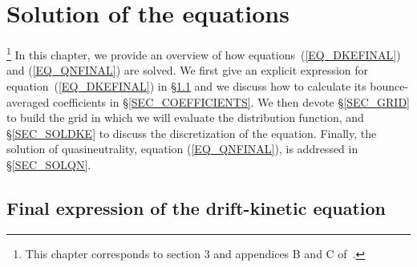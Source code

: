 \chapter{Solution of the equations}\label{CHAP_SOL}

\footnote{This chapter corresponds to section 3 and appendices B and C of~\citep{velasco2019knosos}.}
In this chapter, we provide an overview of how equations~(\ref{EQ_DKEFINAL}) and (\ref{EQ_QNFINAL}) are solved. We first give an explicit expression for equation~(\ref{EQ_DKEFINAL}) in \S\ref{SEC_FINALDKE} and we discuss how to calculate its bounce-averaged coefficients in \S\ref{SEC_COEFFICIENTS}. We then devote \S\ref{SEC_GRID} to build the grid in which we will evaluate the distribution function, and \S\ref{SEC_SOLDKE} to discuss the discretization of the equation. Finally, the solution of quasineutrality, equation  (\ref{EQ_QNFINAL}), is addressed in \S\ref{SEC_SOLQN}.

\section{Final expression of the  drift-kinetic equation}\label{SEC_FINALDKE}

